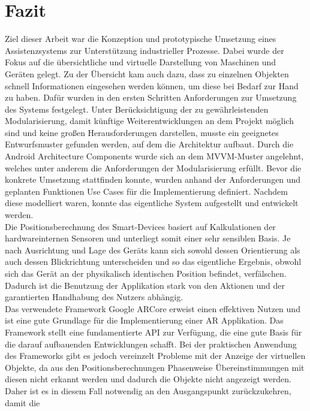 \chapter{Fazit}
\label{chap:Fazit}
Ziel dieser Arbeit war die Konzeption und prototypische Umsetzung eines Assistenzsystems zur Unterstützung industrieller Prozesse. Dabei wurde der Fokus auf die 
übersichtliche und virtuelle Darstellung von Maschinen und Geräten gelegt. Zu der Übersicht kam auch dazu, dass zu einzelnen Objekten schnell Informationen eingesehen 
werden können, um diese bei Bedarf zur Hand zu haben. Dafür wurden in den ersten Schritten Anforderungen zur Umsetzung des Systems festgelegt. Unter Berücksichtigung der 
zu gewährleistenden Modularisierung, damit künftige Weiterentwicklungen an dem Projekt möglich sind und keine großen Herausforderungen darstellen, musste ein geeignetes 
Entwurfsmuster gefunden werden, auf dem die Architektur aufbaut. Durch die Android Architecture Components wurde sich an dem MVVM-Muster angelehnt, welches unter anderem 
die Anforderungen der Modularisierung erfüllt. Bevor die konkrete Umsetzung stattfinden konnte, wurden anhand der Anforderungen und geplanten Funktionen Use Cases für die 
Implementierung definiert. Nachdem diese modelliert waren, konnte das eigentliche System aufgestellt und entwickelt werden.
\\ 
\linebreak
Die Positionsberechnung des Smart-Devices basiert auf Kalkulationen der hardwareinternen Sensoren und unterliegt somit einer sehr sensiblen Basis. Je nach Ausrichtung und 
Lage des Geräts kann sich sowohl dessen Orientierung als auch dessen Blickrichtung unterscheiden und so das eigentliche Ergebnis, obwohl sich das Gerät an der physikalisch 
identischen Position befindet, verfälschen. Dadurch ist die Benutzung der Applikation stark von den Aktionen und der garantierten Handhabung des Nutzers abhängig. 
\\ 
\linebreak
Das verwendete Framework Google ARCore erweist einen effektiven Nutzen und ist eine gute Grundlage für die Implementierung einer \acl{AR} Applikation. Das 
Framework stellt eine fundamentierte \acs{API} zur Verfügung, die eine gute Basis für die darauf aufbauenden Entwicklungen schafft. Bei der praktischen 
Anwendung des Frameworks gibt es jedoch vereinzelt Probleme mit der Anzeige der virtuellen Objekte, da aus den Positionsberechnungen Phasenweise Übereinstimmungen mit diesen 
nicht erkannt werden und dadurch die Objekte nicht angezeigt werden. Daher ist es in diesem Fall notwendig an den Ausgangspunkt zurückzukehren, damit die 
